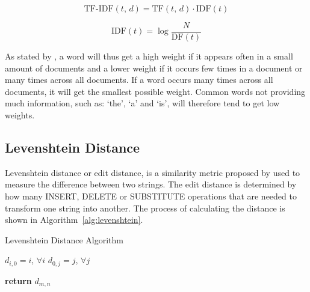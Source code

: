 \begin{equation}
    \text{TF-IDF}\left(t,\, d\right) = \text{TF}\left(t,\, d\right)\cdot \text{IDF}\left(t\right)
\end{equation}

\begin{equation}
    \text{IDF}\left(t\right) = \log\frac{N}{\text{DF}\left(t\right)}
\end{equation}

As stated by \cite{Manning08}, a word will thus get a high weight if it appears often in a small amount of documents and a lower weight if it occurs few times in a document or many times across all documents. If a word occurs many times across all documents, it will get the smallest possible weight. Common words not providing much information, such as: `the', `a' and `is', will therefore tend to get low weights.

\subsection{Levenshtein Distance}
\label{sec:levenshtein}
Levenshtein distance or edit distance, is a similarity metric proposed by \cite{levenshtein66} used to measure the difference between two strings. The edit distance is determined by how many INSERT, DELETE or SUBSTITUTE operations that are needed to transform one string into another. The process of calculating the distance is shown in Algorithm~\ref{alg:levenshtein}.  

\begin{algorithm}
	\DontPrintSemicolon
    \caption{Levenshtein Distance Algorithm}
    \label{alg:levenshtein}
    
 	$d_{i,0}=i$, $\forall i$\;
	$d_{0,j}=j$, $\forall j$\;
    
   \textbf{return} $d_{m, n}$
\end{algorithm}

